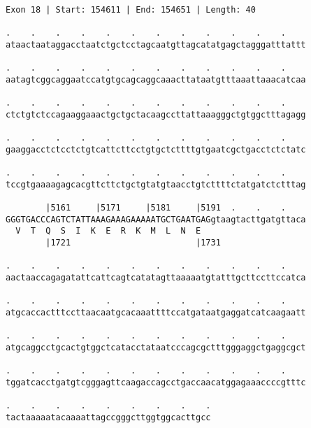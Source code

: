 \documentclass{article}
\begin{document}
\begin{Verbatim}[fontfamily=courier]
Exon 18 | Start: 154611 | End: 154651 | Length: 40

.    .    .    .    .    .    .    .    .    .    .    .    
ataactaataggacctaatctgctcctagcaatgttagcatatgagctagggatttattt

.    .    .    .    .    .    .    .    .    .    .    .    
aatagtcggcaggaatccatgtgcagcaggcaaacttataatgtttaaattaaacatcaa

.    .    .    .    .    .    .    .    .    .    .    .    
ctctgtctccagaaggaaactgctgctacaagccttattaaagggctgtggctttagagg

.    .    .    .    .    .    .    .    .    .    .    .    
gaaggacctctcctctgtcattcttcctgtgctcttttgtgaatcgctgacctctctatc

.    .    .    .    .    .    .    .    .    .    .    .    
tccgtgaaaagagcacgttcttctgctgtatgtaacctgtcttttctatgatctctttag

        |5161     |5171     |5181     |5191  .    .    .    
GGGTGACCCAGTCTATTAAAGAAAGAAAAATGCTGAATGAGgtaagtacttgatgttaca
  V  T  Q  S  I  K  E  R  K  M  L  N  E                     
        |1721                         |1731                 

.    .    .    .    .    .    .    .    .    .    .    .    
aactaaccagagatattcattcagtcatatagttaaaaatgtatttgcttccttccatca

.    .    .    .    .    .    .    .    .    .    .    .    
atgcaccactttccttaacaatgcacaaattttccatgataatgaggatcatcaagaatt

.    .    .    .    .    .    .    .    .    .    .    .    
atgcaggcctgcactgtggctcatacctataatcccagcgctttgggaggctgaggcgct

.    .    .    .    .    .    .    .    .    .    .    .    
tggatcacctgatgtcgggagttcaagaccagcctgaccaacatggagaaaccccgtttc

.    .    .    .    .    .    .    .    .
tactaaaaatacaaaattagccgggcttggtggcacttgcc
\end{Verbatim}
\newpage
\end{document}
